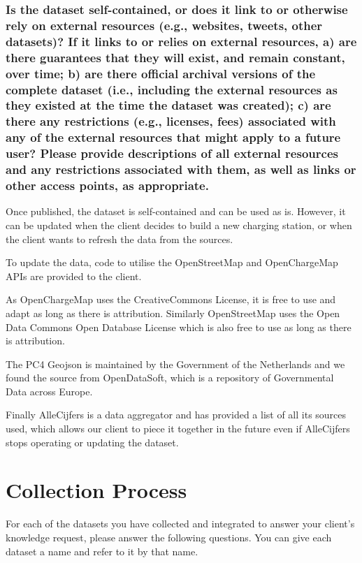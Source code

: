 \documentclass{article}
\newcommand{\question}[1]{#1}
\begin{document}
\question{\subsubsection*{Is the dataset self-contained, or does it link to or otherwise rely on
		external resources (e.g., websites, tweets, other datasets)? If it links
		to or relies on external resources, a) are there guarantees that they will
		exist, and remain constant, over time; b) are there official archival versions
		of the complete dataset (i.e., including the external resources as they existed at the time the dataset was created); c) are there any restrictions
		(e.g., licenses, fees) associated with any of the external resources that
		might apply to a future user? Please provide descriptions of all external
		resources and any restrictions associated with them, as well as links or
		other access points, as appropriate.}}
Once published, the dataset is self-contained and can be used as is. However, it can be updated when the client decides to build a new charging station, or when the client wants to refresh the data from the sources.

To update the data, code to utilise the OpenStreetMap and OpenChargeMap APIs are provided to the client.

As OpenChargeMap uses the CreativeCommons License, it is free to use and adapt as long as there is attribution. Similarly OpenStreetMap uses the Open Data Commons Open Database License which is also free to use as long as there is attribution.

The PC4 Geojson is maintained by the Government of the Netherlands and we found the source from OpenDataSoft, which is a repository of Governmental Data across Europe.

Finally AlleCijfers is a data aggregator and has provided a list of all its sources used, which allows our client to piece it together in the future even if AlleCijfers stops operating or updating the dataset.


\section{Collection Process}
For each of the datasets you have collected and integrated to answer your client's knowledge request, please answer the following questions. You can give each dataset a name and refer to it by that name.
\end{document}
